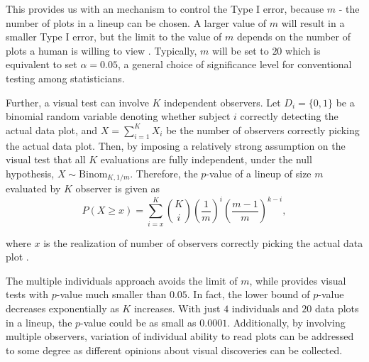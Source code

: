 \documentclass[]{interact}
\theoremstyle{plain}%
\theoremstyle{definition}
\theoremstyle{remark}
\begin{document}
This provides us with an mechanism to control the Type I error, because
\(m\) - the number of plots in a lineup can be chosen. A larger value of
\(m\) will result in a smaller Type I error, but the limit to the value
of \(m\) depends on the number of plots a human is willing to view
\citep{buja_statistical_2009}. Typically, \(m\) will be set to \(20\)
which is equivalent to set \(\alpha = 0.05\), a general choice of
significance level for conventional testing among statisticians.

Further, a visual test can involve \(K\) independent observers. Let
\(D_i = \{0,1\}\) be a binomial random variable denoting whether subject
\(i\) correctly detecting the actual data plot, and
\(X = \sum_{i=1}^{K}X_i\) be the number of observers correctly picking
the actual data plot. Then, by imposing a relatively strong assumption
on the visual test that all \(K\) evaluations are fully independent,
under the null hypothesis, \(X \sim \mathrm{Binom}_{K,1/m}\). Therefore,
the \(p\)-value of a lineup of size \(m\) evaluated by \(K\) observer is
given as \begin{equation} \label{eq:pvaluesingle}
P(X \geq x) = \sum_{i=x}^{K}{{K}\choose{i}}\left(\frac{1}{m}\right)^i\left(\frac{m-1}{m}\right)^{k-i},
\end{equation}

where \(x\) is the realization of number of observers correctly picking
the actual data plot \citep{majumder_validation_2013}.

The multiple individuals approach avoids the limit of \(m\), while
provides visual tests with \(p\)-value much smaller than \(0.05\). In
fact, the lower bound of \(p\)-value decreases exponentially as \(K\)
increases. With just \(4\) individuals and \(20\) data plots in a
lineup, the \(p\)-value could be as small as \(0.0001\). Additionally,
by involving multiple observers, variation of individual ability to read
plots can be addressed to some degree as different opinions about visual
discoveries can be collected.
\end{document}
